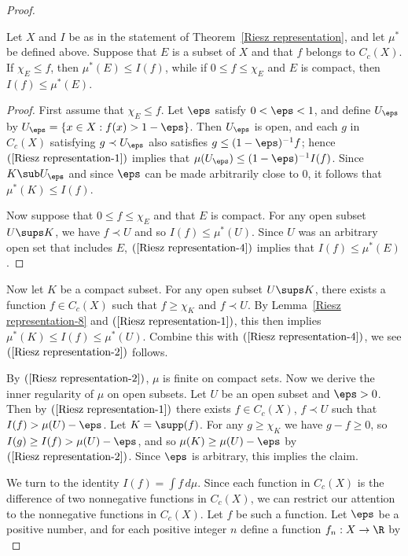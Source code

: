 \begin{proof}
\begin{lemma}\label{Riesz representation-8}
Let $X$ and $I$ be as in the statement of Theorem~\ref{Riesz representation}, and let $\mu^*$ be defined above. Suppose that $E$ is a subset of $X$ and that $f$ belongs to $C_c(X)$. If $\chi_E\leq f$, then $\mu^*(E)\leq I(f)$, while if $0\leq f\leq\chi_E$ and $E$ is compact, then $I(f)\leq\mu^*(E)$.
\end{lemma}
\begin{proof}
First assume that $\chi_E\leq f$. Let $\eps$ satisfy $0<\eps<1$, and define $U_\eps$ by $U_\eps=\{x\in X:f(x)>1-\eps\}$. Then $U_\eps$ is open, and each $g$ in $C_c(X)$ satisfying $g\prec U_\eps$ also satisfies $g\leq(1-\eps)^{-1}f$; hence $(\ref{Riesz representation-1})$ implies that $\mu(U_\eps)\leq(1-\eps)^{-1}I(f)$. Since $K\sub U_\eps$ and since $\eps$ can be made arbitrarily close to $0$, it follows that $\mu^*(K)\leq I(f)$.\par
Now suppose that $0\leq f\leq\chi_E$ and that $E$ is compact. For any open subset $U\sups K$, we have $f\prec U$ and so $I(f)\leq\mu^*(U)$. Since $U$ was an arbitrary open set that includes $E$, $(\ref{Riesz representation-4})$ implies that $I(f)\leq\mu^*(E)$.
\end{proof}
Now let $K$ be a compact subset. For any open subset $U\sups K$, there exists a function $f\in C_c(X)$ such that $f\geq\chi_K$ and $f\prec U$. By Lemma~\ref{Riesz representation-8} and $(\ref{Riesz representation-1})$, this then implies $\mu^*(K)\leq I(f)\leq\mu^*(U)$. Combine this with $(\ref{Riesz representation-4})$, we see $(\ref{Riesz representation-2})$ follows.\par
By $(\ref{Riesz representation-2})$, $\mu$ is finite on compact sets. Now we derive the inner regularity of $\mu$ on open subsets. Let $U$ be an open subset and $\eps>0$. Then by $(\ref{Riesz representation-1})$ there exists $f\in C_c(X)$, $f\prec U$ such that $I(f)>\mu(U)-\eps$. Let $K=\supp(f)$. For any $g\geq\chi_K$ we have $g-f\geq 0$, so $I(g)\geq I(f)>\mu(U)-\eps$, and so $\mu(K)\geq\mu(U)-\eps$ by $(\ref{Riesz representation-2})$. Since $\eps$ is arbitrary, this implies the claim.\par
We turn to the identity $I(f)=\int f\,d\mu$. Since each function in $C_c(X)$ is the difference of two nonnegative functions in $C_c(X)$, we can restrict our attention to the nonnegative functions in $C_c(X)$. Let $f$ be such a function. Let $\eps$ be a positive number, and for each positive integer $n$ define a function $f_n:X\to\R$ by
\begin{equation*}

\end{equation*}
\end{proof}
